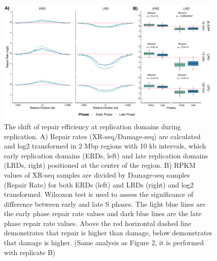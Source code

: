 \begin{figure}[H]
\begin{center}
\includegraphics[width=\textwidth]{Chapters/7_appendix/figures/supfig10}
\caption[The shift of repair efficiency at replication domains during replication.]{The shift of repair efficiency at replication domains during replication. A) Repair rates (XR-seq/Damage-seq) are calculated and log2 transformed in 2 Mbp regions with 10 kb intervals, which early replication domains (ERDs, left) and late replication domains (LRDs, right) positioned at the center of the region. B) RPKM values of XR-seq samples are divided by Damage-seq samples (Repair Rate) for both ERDs (left) and LRDs (right) and log2 transformed. Wilcoxon test is used to assess the significance of difference between early and late S phases. The light blue lines are the early phase repair rate values and dark blue lines are the late phase repair rate values. Above the red horizontal dashed line demonstrates that repair is higher than damage, below demonstrates that damage is higher. (Same analysis as Figure 2, it is performed with replicate B)}
\label{supfig:repdomain}
\end{center}
\end{figure}

